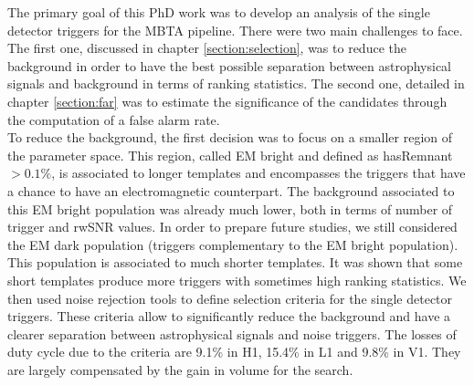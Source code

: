 The primary goal of this PhD work was to develop an analysis of the single detector triggers for the MBTA pipeline.
There were two main challenges to face.
The first one, discussed in chapter \ref{section:selection}, was to reduce the background in order to have the best possible separation between astrophysical signals and background in terms of ranking statistics.
The second one, detailed in chapter \ref{section:far} was to estimate the significance of the candidates through the computation of a false alarm rate.\\

To reduce the background, the first decision was to focus on a smaller region of the parameter space.
This region, called EM bright and defined as hasRemnant $> 0.1\%$, is associated to longer templates and encompasses the triggers that have a chance to have an electromagnetic counterpart.
The background associated to this EM bright population was already much lower, both in terms of number of trigger and rwSNR values.
In order to prepare future studies, we still considered the EM dark population (triggers complementary to the EM bright population).
This population is associated to much shorter templates.
It was shown that some short templates produce more triggers with sometimes high ranking statistics.
We then used noise rejection tools to define selection criteria for the single detector triggers.
These criteria allow to significantly reduce the background and have a clearer separation between astrophysical signals and noise triggers.
The losses of duty cycle due to the criteria are 9.1\% in H1, 15.4\% in L1 and 9.8\% in V1.
They are largely compensated by the gain in volume for the search.\\

